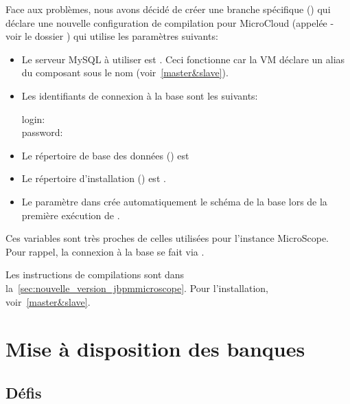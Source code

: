 Face aux problèmes, nous avons décidé de créer une branche spécifique ()
qui déclare une nouvelle configuration de compilation pour MicroCloud (appelée  - voir le dossier )
qui utilise les paramètres suivants:
\begin{itemize}
    \item Le serveur MySQL à utiliser est .
          Ceci fonctionne car la VM  déclare un alias du composant  sous le nom 
          (voir~\autoref{master&slave}).
    \item Les identifiants de connexion à la base  sont les suivants:
          \begin{description}
              \item[login:] 
              \item[password:] 
          \end{description}
    \item Le répertoire de base des données () est 
    \item Le répertoire d'installation () est .
    \item Le paramètre  dans  crée automatiquement le schéma de la base  lors de la première exécution de .
\end{itemize}\vspace*{\baselineskip}

Ces variables sont très proches de celles utilisées pour l'instance MicroScope.
Pour rappel, la connexion à la base se fait via .

Les instructions de compilations sont dans la~\autoref{sec:nouvelle_version_jbpmmicroscope}.
Pour l'installation, voir~\autoref{master&slave}.

\section{Mise à disposition des banques} \label{sec:acces_banques}

\subsection{Défis}


